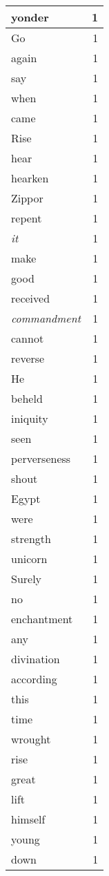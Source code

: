 \begin{center}
\begin{longtable}{l|r}
yonder & 1\\ \hline 
Go & 1\\ \hline 
again & 1\\ \hline 
say & 1\\ \hline 
when & 1\\ \hline 
came & 1\\ \hline 
Rise & 1\\ \hline 
hear & 1\\ \hline 
hearken & 1\\ \hline 
Zippor & 1\\ \hline 
repent & 1\\ \hline 
\emph{it} & 1\\ \hline 
make & 1\\ \hline 
good & 1\\ \hline 
received & 1\\ \hline 
\emph{commandment} & 1\\ \hline 
cannot & 1\\ \hline 
reverse & 1\\ \hline 
He & 1\\ \hline 
beheld & 1\\ \hline 
iniquity & 1\\ \hline 
seen & 1\\ \hline 
perverseness & 1\\ \hline 
shout & 1\\ \hline 
Egypt & 1\\ \hline 
were & 1\\ \hline 
strength & 1\\ \hline 
unicorn & 1\\ \hline 
Surely & 1\\ \hline 
no & 1\\ \hline 
enchantment & 1\\ \hline 
any & 1\\ \hline 
divination & 1\\ \hline 
according & 1\\ \hline 
this & 1\\ \hline 
time & 1\\ \hline 
wrought & 1\\ \hline 
rise & 1\\ \hline 
great & 1\\ \hline 
lift & 1\\ \hline 
himself & 1\\ \hline 
young & 1\\ \hline 
down & 1\\ \hline 

\end{longtable}
\end{center}
